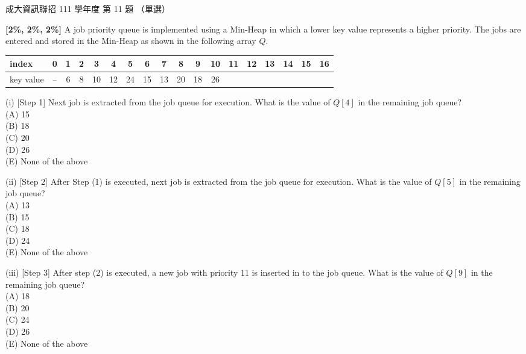 \begin{pastexam}[label={px:ncku-111-prog-11}]{成大資訊聯招 111 學年度 第 11 題}
（單選）

\textbf{[2\%, 2\%, 2\%]} A job priority queue is implemented using a Min-Heap in which a lower key value represents a higher priority. The jobs are entered and stored in the Min-Heap as shown in the following array $Q$.
\begin{center}
\begin{tabular}{l*{17}{c}}
index & 0 & 1 & 2 & 3 & 4 & 5 & 6 & 7 & 8 & 9 & 10 & 11 & 12 & 13 & 14 & 15 & 16\\ \hline
key value & -- & 6 & 8 & 10 & 12 & 24 & 15 & 13 & 20 & 18 & 26 & & & & & &
\end{tabular}
\end{center}
\smallskip
(i) [Step 1] Next job is extracted from the job queue for execution. What is the value of $Q[4]$ in the remaining job queue?\\
(A) 15\\
(B) 18\\
(C) 20\\
(D) 26\\
(E) None of the above

(ii) [Step 2] After Step (1) is executed, next job is extracted from the job queue for execution. What is the value of $Q[5]$ in the remaining job queue?\\
(A) 13\\
(B) 15\\
(C) 18\\
(D) 24\\
(E) None of the above

(iii) [Step 3] After step (2) is executed, a new job with priority 11 is inserted in to the job queue. What is the value of $Q[9]$ in the remaining job queue?\\
(A) 18\\
(B) 20\\
(C) 24\\
(D) 26\\
(E) None of the above
\end{pastexam}

